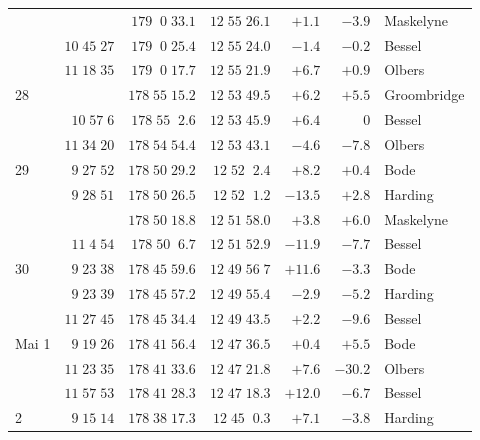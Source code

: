 \begin{longtable}{l|r|r|r|r|r|l}
 &  & $179\;\;0\;33.1$ & $12\;55\;26.1$ & $+1.1$ & $-3.9$ & Maskelyne \\
 & $10\;45\;27$ & $179\;\;0\;25.4$ & $12\;55\;24.0$ & $-1.4$ & $-0.2$ & Bessel \\
 & $11\;18\;35$ & $179\;\;0\;17.7$ & $12\;55\;21.9$ & $+6.7$ & $+0.9$ & Olbers \\
28 &  & $178\;55\;15.2$ & $12\;53\;49.5$ & $+6.2$ & $+5.5$ & Groombridge \\
 & $10\;57\;6$ & $178\;55\;\;2.6$ & $12\;53\;45.9$ & $+6.4$ & $0$ & Bessel \\
 & $11\;34\;20$ & $178\;54\;54.4$ & $12\;53\;43.1$ & $-4.6$ & $-7.8$ & Olbers \\
29 & $9\;27\;52$ & $178\;50\;29.2$ & $12\;52\;\;2.4$ & $+8.2$ & $+0.4$ & Bode \\
 & $9\;28\;51$ & $178\;50\;26.5$ & $12\;52\;\;1.2$ & $-13.5$ & $+2.8$ & Harding \\
 &  & $178\;50\;18.8$ & $12\;51\;58.0$ & $+3.8$ & $+6.0$ & Maskelyne \\
 & $11\;4\;54$ & $178\;50\;\;6.7$ & $12\;51\;52.9$ & $-11.9$ & $-7.7$ & Bessel \\
30 & $9\;23\;38$ & $178\;45\;59.6$ & $12\;49\;56\;7$ & $+11.6$ & $-3.3$ & Bode \\
 & $9\;23\;39$ & $178\;45\;57.2$ & $12\;49\;55.4$ & $-2.9$ & $-5.2$ & Harding \\
 & $11\;27\;45$ & $178\;45\;34.4$ & $12\;49\;43.5$ & $+2.2$ & $-9.6$ & Bessel \\
Mai 1 & $9\;19\;26$ & $178\;41\;56.4$ & $12\;47\;36.5$ & $+0.4$ & $+5.5$ & Bode \\
 & $11\;23\;35$ & $178\;41\;33.6$ & $12\;47\;21.8$ & $+7.6$ & $-30.2$ & Olbers \\
 & $11\;57\;53$ & $178\;41\;28.3$ & $12\;47\;18.3$ & $+12.0$ & $-6.7$ & Bessel \\
2 & $9\;15\;14$ & $178\;38\;17.3$ & $12\;45\;\;0.3$ & $+7.1$ & $-3.8$ & Harding \\
\end{longtable}
\endgroup

